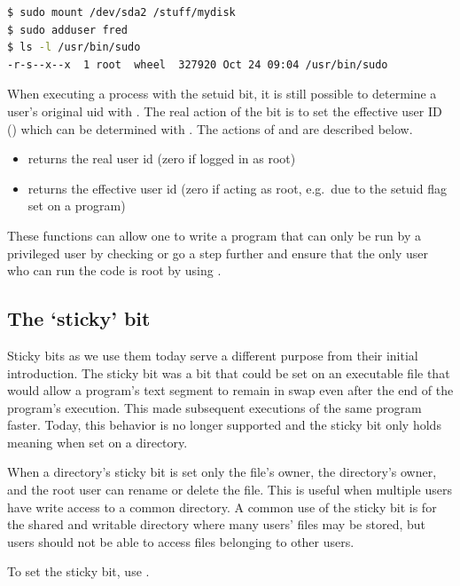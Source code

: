 \begin{lstlisting}[language=bash]
$ sudo mount /dev/sda2 /stuff/mydisk
$ sudo adduser fred
$ ls -l /usr/bin/sudo
-r-s--x--x  1 root  wheel  327920 Oct 24 09:04 /usr/bin/sudo
\end{lstlisting}

When executing a process with the setuid bit, it is still possible to determine a user's original uid with .
The real action of the  bit is to set the effective user ID () which can be determined with .
The actions of  and  are described below.

\begin{itemize}
\tightlist
\item
   returns the real user id (zero if logged in as root)
\item
   returns the effective user id (zero if acting as root, e.g.~due to the setuid flag set on a program)
\end{itemize}

These functions can allow one to write a program that can only be run by a privileged user by checking  or go a step further and ensure that the only user who can run the code is root by using .

\subsection{The `sticky' bit}

Sticky bits as we use them today serve a different purpose from their initial introduction.
The sticky bit was a bit that could be set on an executable file that would allow a program's text segment to remain in swap even after the end of the program's execution.
This made subsequent executions of the same program faster.
Today, this behavior is no longer supported and the sticky bit only holds meaning when set on a directory.

When a directory's sticky bit is set only the file's owner, the directory's owner, and the root user can rename or delete the file.
This is useful when multiple users have write access to a common directory.
A common use of the sticky bit is for the shared and writable  directory where many users' files may be stored, but users should not be able to access files belonging to other users.

To set the sticky bit, use .

